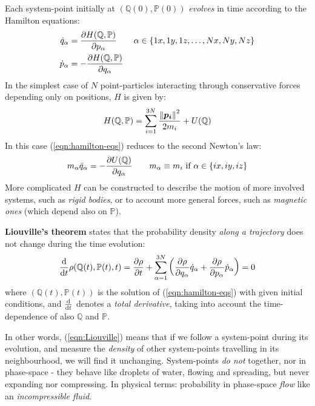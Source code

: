 \documentclass[../template.tex]{subfiles}
\begin{document}
\medskip

Each system-point initially at $(\mathbb{Q}(0), \mathbb{P}(0))$ \textit{evolves} in time according to the Hamilton equations:
\begin{align}\label{eqn:hamilton-eqs}
    \dot{q}_\alpha &= \pdv{H(\mathbb{Q},\mathbb{P})}{p_\alpha}\qquad \alpha \in \{1x, 1y, 1z,\dots, Nx, Ny, Nz\}\\
    \dot{p}_{\alpha} &= -\pdv{H(\mathbb{Q},\mathbb{P})}{q_\alpha}
\end{align} 
In the simplest case of $N$ point-particles interacting through conservative forces depending only on positions, $H$ is given by:
\begin{align*}
    H(\mathbb{Q},\mathbb{P}) = \sum_{i=1}^{3N} \frac{\norm{\bm{p_i}}^2}{2m_i} + U(\mathbb{Q}) 
\end{align*}
In this case (\ref{eqn:hamilton-eqs}) reduces to the second Newton's law:
\begin{align}\label{eqn:newton-eqs}
    m_\alpha \ddot{q}_\alpha = - \pdv{U(\mathbb{Q})}{q_\alpha} \qquad m_\alpha \equiv m_i \text{ if } \alpha \in \{ix,iy,iz\}
\end{align}
More complicated $H$ can be constructed to describe the motion of more involved systems, such as \textit{rigid bodies}, or to account more general forces, such as \textit{magnetic ones} (which depend also on $\mathbb{P}$).

\medskip

\textbf{Liouville's theorem} states that the probability density \textit{along a trajectory} does not change during the time evolution: 
\begin{align}\label{eqn:Liouville}
    \dv{t} \rho(\mathbb{Q}(t), \mathbb{P}(t),t) = \pdv{\rho}{t} + \sum_{\alpha=1}^{3N} \left(\pdv{\rho}{q_\alpha} \dot{q}_\alpha + \pdv{\rho}{p_\alpha} \dot{p}_\alpha\right) = 0
\end{align}
where $(\mathbb{Q}(t), \mathbb{P}(t))$ is the solution of (\ref{eqn:hamilton-eqs}) with given initial conditions, and $\dv{t}$ denotes a \textit{total derivative}, taking into account the time-dependence of also $\mathbb{Q}$ and $\mathbb{P}$.  

\medskip

In other words, (\ref{eqn:Liouville}) means that if we follow a system-point during its evolution, and measure the \textit{density} of other system-points travelling in its neighbourhood, we will find it unchanging. System-points \textit{do not}  together, nor  in phase-space - they behave like droplets of water, flowing and spreading, but never expanding nor compressing. In physical terms: probability in phase-space \textit{flow} like an \textit{incompressible fluid}.   
\end{document}
